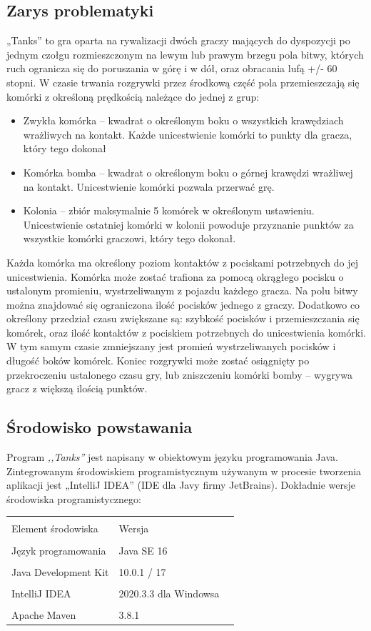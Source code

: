 \documentclass[11pt,a4paper]{report}
\begin{document}
\subsection {Zarys problematyki}
„Tanks” to gra oparta na rywalizacji dwóch graczy mających do dyspozycji po jednym czołgu rozmieszczonym na lewym lub prawym brzegu pola bitwy, których ruch ogranicza się do poruszania w górę i w dół, oraz obracania lufą +/- 60 stopni. W czasie trwania rozgrywki przez środkową część pola przemieszczają się komórki z określoną prędkością należące do jednej z grup:
\begin{itemize}
\item {Zwykła komórka} -- kwadrat o określonym boku o wszystkich krawędziach wrażliwych na kontakt. Każde unicestwienie komórki to punkty dla gracza, który tego dokonał
\item {Komórka bomba} -- kwadrat o określonym boku o górnej krawędzi wrażliwej na kontakt. Unicestwienie komórki pozwala przerwać grę.
\item {Kolonia} -- zbiór maksymalnie 5 komórek w określonym ustawieniu. Unicestwienie ostatniej komórki w kolonii powoduje przyznanie punktów za wszystkie komórki graczowi, który tego dokonał.
\end{itemize}
Każda komórka ma określony poziom kontaktów z pociskami potrzebnych do jej unicestwienia.
Komórka może zostać trafiona za pomocą okrągłego pocisku o ustalonym promieniu, wystrzeliwanym z pojazdu każdego gracza. Na polu bitwy można znajdować się ograniczona ilość pocisków jednego z graczy. Dodatkowo co określony przedział czasu zwiększane są: szybkość pocisków i przemieszczania się komórek, oraz ilość kontaktów z pociskiem potrzebnych do unicestwienia komórki. W tym samym czasie zmniejszany jest promień wystrzeliwanych pocisków i długość boków komórek.
Koniec rozgrywki może zostać osiągnięty po przekroczeniu ustalonego czasu gry, lub zniszczeniu komórki bomby – wygrywa gracz z większą ilością punktów.


\subsection {Środowisko powstawania}
Program \textsl{,,Tanks''} jest napisany w obiektowym języku programowania Java. Zintegrowanym środowiskiem programistycznym używanym w procesie tworzenia aplikacji jest „IntelliJ IDEA” (IDE dla Javy firmy JetBrains). Dokładnie wersje środowiska programistycznego:\\
\begin{tabularx}{\textwidth}{  X|Xl  }
 \hline
 \\Element środowiska                                   					& Wersja\\
 \hline \hline
			\\Język programowania			&Java SE 16\\
 \hline
			\\Java Development Kit			&10.0.1 / 17\\
 \hline
			\\IntelliJ IDEA				&2020.3.3 dla Windowsa\\
\hline 
			\\Apache Maven 				&3.8.1\\
 \hline
\end{tabularx}
\end{document}
